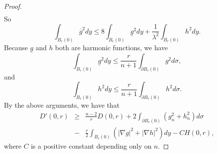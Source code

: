 \documentclass[a4paper, 12pt, onecolumn]{article} \textwidth 148mm
\begin{document}
\begin{proof}
\begin{eqnarray*}
\end{eqnarray*}
So
\begin{equation*}
\int_{B_r(0)}\overline{g}^2dy\leq8\int_{B_r(0)}\underline{g}^2dy+\frac{1}{\lambda^2}\int_{B_r(0)}h^2dy.
\end{equation*}
Because $\underline{g}$ and $h$ both are harmonic functions, we have
\begin{equation*}
\int_{B_r(0)}\underline{g}^2dy\leq\frac{r}{n+1}\int_{\partial B_r(0)}g^2d\sigma,
\end{equation*}
and
\begin{equation*}
\int_{B_r(0)}h^2dy\leq\frac{r}{n+1}\int_{\partial B_r(0)}h^2d\sigma.
\end{equation*}
By the above arguments, we have that
\begin{eqnarray*}
D'(0,r)&\geq&\frac{n-2}{r}D(0,r)+2\int_{\partial B_r(0)}\left(g_n^2+h_n^2\right)d\sigma
\\&-&\frac{r}{2}\int_{B_r(0)}\left(|\nabla g|^2+|\nabla h|^2\right)dy-CH(0,r),
\end{eqnarray*}
where $C$ is a positive constant depending only on $n$.


\end{proof}
\end{document}
